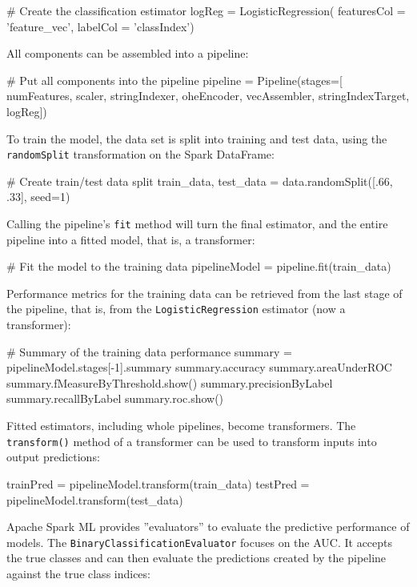 \begin{pythoncode}
# Create the classification estimator
logReg = LogisticRegression(
    featuresCol = 'feature_vec', labelCol = 'classIndex')
\end{pythoncode}
All components can be assembled into a pipeline:

\begin{pythoncode}
# Put all components into the pipeline
pipeline = Pipeline(stages=[
    numFeatures,
    scaler,
    stringIndexer,
    oheEncoder,
    vecAssembler,
    stringIndexTarget,
    logReg])
\end{pythoncode}

To train the model, the data set is split into training and test data, using the \texttt{randomSplit} transformation on the Spark DataFrame:

\begin{pythoncode}
# Create train/test data split
train_data, test_data = data.randomSplit([.66, .33], seed=1)
\end{pythoncode}

Calling the pipeline's \texttt{fit} method will turn the final estimator, and the entire pipeline into a fitted model, that is, a transformer:

\begin{pythoncode}
# Fit the model to the training data
pipelineModel = pipeline.fit(train_data)
\end{pythoncode}

Performance metrics for the training data can be retrieved from the last stage of the pipeline, that is, from the \texttt{LogisticRegression} estimator (now a transformer):

\begin{pythoncode}
# Summary of the training data performance
summary = pipelineModel.stages[-1].summary
summary.accuracy
summary.areaUnderROC
summary.fMeasureByThreshold.show()
summary.precisionByLabel
summary.recallByLabel
summary.roc.show()
\end{pythoncode}

Fitted estimators, including whole pipelines, become transformers. The \texttt{transform()} method of a transformer can be used to transform inputs into output predictions: 

\begin{pythoncode}
trainPred = pipelineModel.transform(train_data)
testPred = pipelineModel.transform(test_data)
\end{pythoncode}

Apache Spark ML provides ''evaluators'' to evaluate the predictive performance of models. The \texttt{BinaryClassificationEvaluator} focuses on the AUC. It accepts the true classes and can then evaluate the predictions created by the pipeline against the true class indices:

